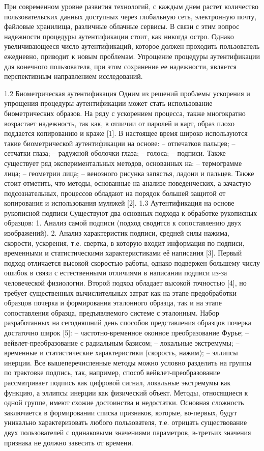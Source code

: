 При современном уровне развития технологий, с каждым днем растет количество пользовательских данных доступных через глобальную сеть, электронную почту, файловые хранилища, различные облачные сервисы. В связи с этим вопрос надежности процедуры аутентификации стоит, как никогда остро. Однако увеличивающееся число аутентификаций, которое должен проходить пользователь ежедневно, приводит к новым проблемам. Упрощение процедуры аутентификации для конечного пользователя, при этом сохранение ее надежности, является перспективным направлением исследований.

1.2 Биометрическая аутентификация
Одним из решений проблемы ускорения и упрощения процедуры аутентификации может стать использование биометрических образов. На ряду с ускорением процесса, также многократно возрастает надежность, так как, в отличии от паролей и карт, образ плохо поддается копированию и краже [1].
В настоящее время широко используются такие биометрической аутентификации на основе:
– отпечатков пальцев;
– сетчатки глаза;
– радужной оболочки глаза;
– голоса;
– подписи.
Также существует ряд экспериментальных методов, основанных на:
– термограмме лица;
– геометрии лица;
– венозного рисунка запястья, ладони и пальцев.
Также стоит отметить, что методы, основанные на анализе поведенческих, а зачастую подсознательных, процессов обладают на порядок большей защитой от копирования и использования муляжей [2].
1.3 Аутентификация на основе рукописной подписи
Существуют два основных подхода к обработке рукописных образцов:
1. Анализ самой подписи (подход сводится к сопоставлению двух изображений).
2. Анализ характеристик подписи, средней силы нажима, скорости, ускорения, т.е. свертка, в которую входит информация по подписи, временными и статистическими характеристиками её написания [3].
Первый подход отличается высокой скоростью работы, однако подвержен большему числу ошибок в связи с естественными отличиями в написании подписи из-за человеческой физиологии.
Второй подход обладает высокой точностью [4], но требует существенных вычислительных затрат как на этапе предобработки образцов почерка и формирования эталонного образца, так и на этапе сопоставления образца, предъявляемого системе с эталонным.
Набор разработанных на сегодняшний день способов представления образцов почерка достаточно широк [5]:
– частотно-временное оконное преобразование Фурье;
– вейвлет-преобразование с радиальным базисом;
– локальные экстремумы;
– временные и статистические характеристики (скорость, нажим);
– эллипсы инерции.
Все вышеперечисленные методы можно условно разделить на группы по трактовке подпись, так, например, способ вейвлет-преобразование рассматривает подпись как цифровой сигнал, локальные экстремумы как функцию, а эллипсы инерции как физический объект. Методы, относящиеся к одной группе, имеют схожие достоинства и недостатки.
Основная сложность заключается в формировании списка признаков, которые, во-первых, будут уникально характеризовать любого пользователя, т.е. отрицать существование двух пользователей с одинаковыми значениями параметров, в-третьих значения признака не должно завесить от времени.
